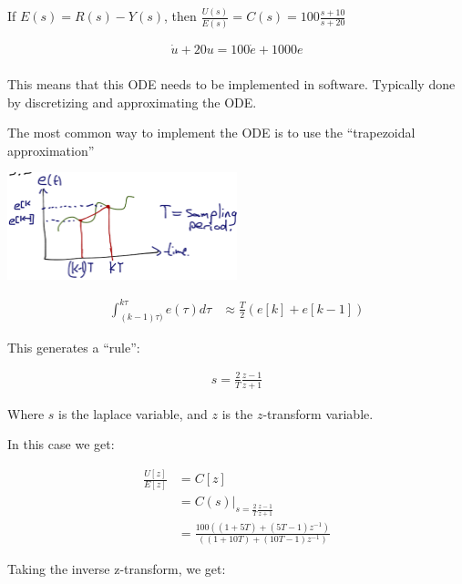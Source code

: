 \begin{enumerate}
            If $E(s) = R(s) - Y(s)$, then $\frac{U(s)}{E(s)} = C(s) = 100 \frac{s + 10}{s+20}$

            \begin{align*}
                \dot u + 20u = 100 \dot e + 1000e \\
            \end{align*}

            This means that this ODE needs to be implemented in software. Typically done by discretizing and approximating the ODE.

            The most common way to implement the ODE is to use the ``trapezoidal approximation''

            \begin{center}\includegraphics[width=0.5\textwidth,keepaspectratio]{images/5-3.png}\end{center}

            \begin{align*}
                \int^{k \tau }_{(k-1) \tau )} e( \tau )d \tau &\approx \frac{T}{2} \left( e[k] + e[k-1] \right)
            \end{align*}

            This generates a ``rule'':

            \begin{align*}
                s = \frac{2}{T} \frac{z - 1}{z + 1}
            \end{align*}

            Where $s$ is the laplace variable, and $z$ is the $z$-transform variable.

            In this case we get:

            \begin{align*}
                \frac{U[z]}{E[z]} &= C[z] \\
                 &= C(s)\Big|_{s = \frac{2}{T} \frac{z - 1}{z + 1}} \\
                 &= \frac{100 ((1+5T) + (5T - 1)z^{-1})}{((1+10T) + (10T -1) z^{-1})}
            \end{align*}

            Taking the inverse z-transform, we get:


\end{enumerate}
